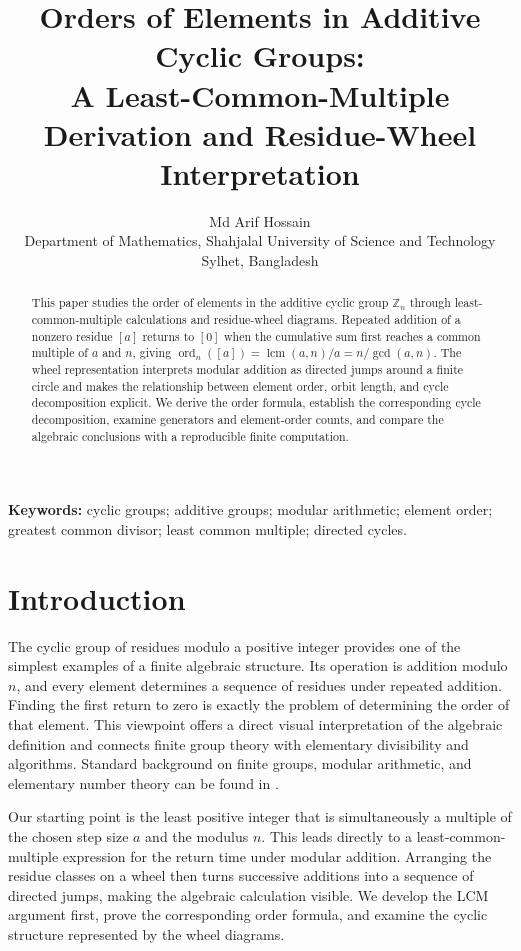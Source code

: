 \documentclass[11pt,a4paper]{article}
\title{Orders of Elements in Additive Cyclic Groups:\\[2pt]\large A Least-Common-Multiple Derivation and Residue-Wheel Interpretation}
\author{Md Arif Hossain\\\small Department of Mathematics, Shahjalal University of Science and Technology\\\small Sylhet, Bangladesh}
\date{}
\theoremstyle{definition}
\theoremstyle{remark}
\DeclareMathOperator{\ord}{ord}
\DeclareMathOperator{\lcm}{lcm}
\begin{document}
\maketitle
\begin{abstract}
This paper studies the order of elements in the additive cyclic group $\mathbb Z_n$ through least-common-multiple calculations and residue-wheel diagrams. Repeated addition of a nonzero residue $[a]$ returns to $[0]$ when the cumulative sum first reaches a common multiple of $a$ and $n$, giving $\ord_n([a])=\lcm(a,n)/a=n/\gcd(a,n)$. The wheel representation interprets modular addition as directed jumps around a finite circle and makes the relationship between element order, orbit length, and cycle decomposition explicit. We derive the order formula, establish the corresponding cycle decomposition, examine generators and element-order counts, and compare the algebraic conclusions with a reproducible finite computation.
\end{abstract}
\noindent\textbf{Keywords:} cyclic groups; additive groups; modular arithmetic; element order; greatest common divisor; least common multiple; directed cycles.

\section{Introduction}
The cyclic group of residues modulo a positive integer provides one of the simplest examples of a finite algebraic structure. Its operation is addition modulo $n$, and every element determines a sequence of residues under repeated addition. Finding the first return to zero is exactly the problem of determining the order of that element. This viewpoint offers a direct visual interpretation of the algebraic definition and connects finite group theory with elementary divisibility and algorithms. Standard background on finite groups, modular arithmetic, and elementary number theory can be found in \cite{gallian2021contemporary,finston2014abstract,clapham2014concise,hardy1979introduction}.

Our starting point is the least positive integer that is simultaneously a multiple of the chosen step size $a$ and the modulus $n$. This leads directly to a least-common-multiple expression for the return time under modular addition. Arranging the residue classes on a wheel then turns successive additions into a sequence of directed jumps, making the algebraic calculation visible. We develop the LCM argument first, prove the corresponding order formula, and examine the cyclic structure represented by the wheel diagrams.
\end{document}
